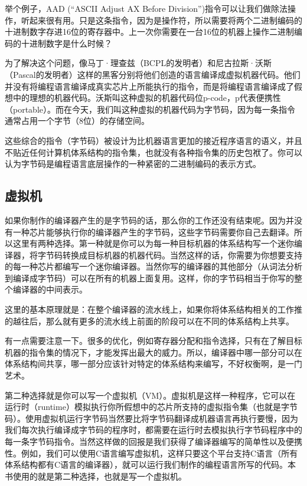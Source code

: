 \documentclass[cn,10pt,math=newtx,citestyle=gb7714-2015,bibstyle=gb7714-2015]{elegantbook}
\begin{document}
\begin{tcolorbox}
举个例子，AAD (“ASCII Adjust AX Before Division”)指令可以让我们做除法操作，听起来很有用。只是这条指令，因为是操作符，所以需要将两个二进制编码的十进制数字存进16位的寄存器中。上一次你需要在一台16位的机器上操作二进制编码的十进制数字是什么时候？
\end{tcolorbox}

为了解决这个问题，像马丁·理查兹（BCPL的发明者）和尼古拉斯·沃斯（Pascal的发明者）这样的黑客分别将他们创造的语言编译成虚拟机器代码。他们并没有将编程语言编译成真实芯片上所能执行的指令，而是将编程语言编译成了假想中的理想的机器代码。沃斯叫这种虚拟的机器代码位p-code，p代表便携性（portable）。而在今天，我们叫这种虚拟的机器代码为字节码，因为每一条指令通常占用一个字节（8位）的存储空间。

这些综合的指令（字节码）被设计为比机器语言更加的接近程序语言的语义，并且不贴近任何计算机体系结构的指令集，也就没有各种指令集的历史包袱了。你可以认为字节码是编程语言底层操作的一种紧密的二进制编码的表示方式。

\subsection{虚拟机}

如果你制作的编译器产生的是字节码的话，那么你的工作还没有结束呢。因为并没有一种芯片能够执行你的编译器产生的字节码，这些字节码需要你自己去翻译。所以这里有两种选择。第一种就是你可以为每一种目标机器的体系结构写一个迷你编译器，将字节码转换成目标机器的机器代码。当然这样的话，你需要为你想要支持的每一种芯片都编写一个迷你编译器。当然你写的编译器的其他部分（从词法分析到编译成字节码）可以在所有的机器上面复用。这样，你的字节码相当于你写的整个编译器的中间表示。

\begin{tcolorbox}
这里的基本原理就是：在整个编译器的流水线上，如果你将体系结构相关的工作推的越往后，那么就有更多的流水线上前面的阶段可以在不同的体系结构上共享。

有一点需要注意一下。很多的优化，例如寄存器分配和指令选择，只有在了解目标机器的指令集的情况下，才能发挥出最大的威力。所以，编译器中哪一部分可以在体系结构间共享，哪一部分应该针对特定的体系结构来编写，不好权衡啊，是一门艺术。
\end{tcolorbox}

第二种选择就是你可以写一个虚拟机（VM）。虚拟机是这样一种程序，它可以在运行时（runtime）模拟执行你所假想中的芯片所支持的虚拟指令集（也就是字节码）。使用虚拟机运行字节码当然要比将字节码翻译成机器语言再执行要慢，因为我们每次执行编译成字节码的程序时，都需要在运行时去模拟执行字节码程序中的每一条字节码指令。当然这样做的回报是我们获得了编译器编写的简单性以及便携性。例如，我们可以使用C语言编写虚拟机，这样只要这个平台支持C语言（所有体系结构都有C语言的编译器），就可以运行我们制作的编程语言所写的代码。本书使用的就是第二种选择，也就是写一个虚拟机。
\end{document}
